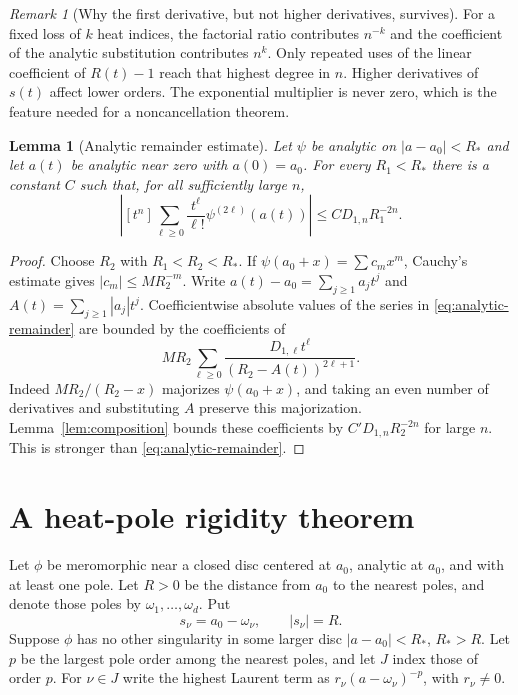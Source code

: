 \documentclass[11pt,a4paper]{article}
\numberwithin{equation}{section}
\newtheorem{lemma}[theorem]{Lemma}
\theoremstyle{definition}
\theoremstyle{remark}
\newtheorem{remark}[theorem]{Remark}
\newcommand{\coef}[2]{[#1^{#2}]}
\begin{document}
\begin{remark}[Why the first derivative, but not higher derivatives, survives]
For a fixed loss of $k$ heat indices, the factorial ratio contributes
$n^{-k}$ and the coefficient of the analytic substitution contributes
$n^k$.  Only repeated uses of the linear coefficient of $R(t)-1$ reach
that highest degree in $n$.  Higher derivatives of $s(t)$ affect lower
orders.  The exponential multiplier is never zero, which is the feature
needed for a noncancellation theorem.
\end{remark}

\begin{lemma}[Analytic remainder estimate]
\label{lem:analytic-remainder}
Let $\psi$ be analytic on $|a-a_0|<R_*$ and let $a(t)$ be analytic near
zero with $a(0)=a_0$.  For every $R_1<R_*$ there is a constant $C$ such
that, for all sufficiently large $n$,
\begin{equation}
 \left|\coef{t}{n}
   \sum_{\ell\ge0}\frac{t^\ell}{\ell!}
               \psi^{(2\ell)}(a(t))\right|
       \le C D_{1,n}R_1^{-2n}.
 \label{eq:analytic-remainder}
\end{equation}
\end{lemma}

\begin{proof}
Choose $R_2$ with $R_1<R_2<R_*$.  If
$\psi(a_0+x)=\sum c_mx^m$, Cauchy's estimate gives
$|c_m|\le M R_2^{-m}$.  Write
$a(t)-a_0=\sum_{j\ge1}a_jt^j$ and
$A(t)=\sum_{j\ge1}|a_j|t^j$.
Coefficientwise absolute values of the series in
\eqref{eq:analytic-remainder} are bounded by the coefficients of
\[
 M R_2\sum_{\ell\ge0}
       \frac{D_{1,\ell}t^\ell}{(R_2-A(t))^{2\ell+1}}.
\]
Indeed $M R_2/(R_2-x)$ majorizes $\psi(a_0+x)$, and taking an even
number of derivatives and substituting $A$ preserve this majorization.
Lemma~\ref{lem:composition} bounds these coefficients by
$C'D_{1,n}R_2^{-2n}$ for large $n$.  This is stronger than
\eqref{eq:analytic-remainder}.
\end{proof}

\section{A heat-pole rigidity theorem}
\label{sec:rigidity}

Let $\phi$ be meromorphic near a closed disc centered at $a_0$, analytic
at $a_0$, and with at least one pole.  Let $R>0$ be the distance from
$a_0$ to the nearest poles, and denote those poles by
$\omega_1,\ldots,\omega_d$.  Put
\begin{equation}
 s_\nu=a_0-\omega_\nu,\qquad |s_\nu|=R.
 \label{eq:pole-distances}
\end{equation}
Suppose $\phi$ has no other singularity in some larger disc
$|a-a_0|<R_*$, $R_*>R$.  Let $p$ be the largest pole order among the
nearest poles, and let $J$ index those of order $p$.  For $\nu\in J$
write the highest Laurent term as
$r_\nu(a-\omega_\nu)^{-p}$, with $r_\nu\ne0$.
\end{document}

